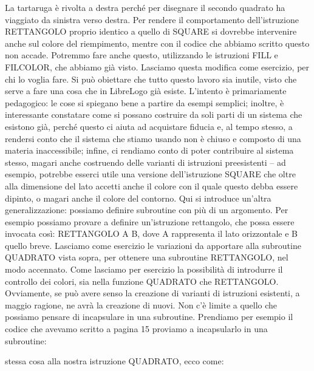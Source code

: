\vskip 0.5cm

La tartaruga è rivolta a destra perché per disegnare il secondo quadrato ha viaggiato da sinistra verso destra. Per rendere il comportamento dell'istruzione RETTANGOLO proprio identico a quello di SQUARE si dovrebbe intervenire anche sul colore del riempimento, mentre con il codice che abbiamo scritto questo non accade. Potremmo fare anche questo, utilizzando le istruzioni FILL  e FILCOLOR, che abbiamo già visto. Lasciamo questa modifica come esercizio, per chi lo voglia fare. 
Si può obiettare che tutto questo lavoro sia inutile, visto che serve a fare una cosa che in LibreLogo già esiste. L'intento è primariamente pedagogico: le cose si spiegano bene a partire da esempi semplici; inoltre, è interessante constatare come si possano costruire da soli parti di un sistema che esistono già, perché questo ci aiuta ad acquistare fiducia e, al tempo stesso,  a rendersi conto che il sistema che stiamo usando non è chiuso e composto di una materia inaccessibile; infine, ci rendiamo conto di poter contribuire al sistema stesso, magari anche costruendo delle varianti di istruzioni preesistenti – ad esempio, potrebbe esserci utile una  versione dell'istruzione SQUARE che oltre alla dimensione del lato accetti anche il colore con il quale questo debba essere dipinto, o magari anche il colore del contorno. Qui si introduce un'altra generalizzazione: possiamo definire subroutine con più di un argomento. Per esempio possiamo provare a definire un'istruzione rettangolo, che possa essere invocata così: RETTANGOLO A B, dove A rappresenta il lato orizzontale e B quello breve. Lasciamo come esercizio le variazioni da apportare alla subroutine QUADRATO vista sopra, per ottenere una subroutine RETTANGOLO, nel modo accennato. Come lasciamo per esercizio la possibilità di introdurre il controllo dei colori, sia nella funzione QUADRATO che RETTANGOLO.
Ovviamente, se può avere senso la creazione di varianti di istruzioni esistenti, a maggio ragione, ne avrà la creazione di nuovi. Non c'è limite a quello che possiamo pensare di incapsulare in una subroutine. Prendiamo per esempio il codice che avevamo scritto a pagina 15 proviamo a incapsularlo in una subroutine:

stessa cosa alla nostra istruzione QUADRATO, ecco come:

\vskip 1cm

